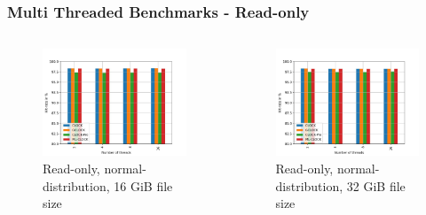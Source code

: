\documentclass[
	aspectratio=169,
	compress,
]{beamer}
\newcommand{\navframetitle}[1]{\frametitle{#1\hfill{\footnotesize\lastsection{}}}}
\begin{document}
\begin{frame}[fragile]
	\navframetitle{Multi Threaded Benchmarks - Read-only}

	\begin{columns}
		\begin{column}{0.5\textwidth}
			\begin{figure}[ht]
    			\centering
    			\includegraphics[width=\textwidth]{multi_16_gb_randread_normal.jpg}
        		\caption{Read-only, normal-distribution, 16 GiB file size}
			\end{figure}
		\end{column}
		\begin{column}{0.5\textwidth}
			\begin{figure}[ht]
    			\centering
    			\includegraphics[width=\textwidth]{multi_32_gb_randread_normal.jpg}
        		\caption{Read-only, normal-distribution, 32 GiB file size}
			\end{figure}			
		\end{column}
	\end{columns}
\end{frame}
\end{document}
